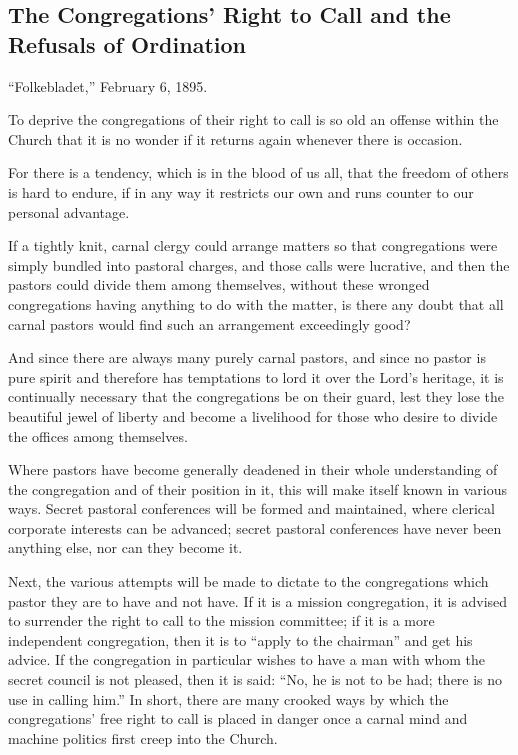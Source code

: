 
\subsection{The Congregations’ Right to Call and the Refusals of Ordination}

“Folkebladet,” February 6, 1895.

To deprive the congregations of their right to call is so old an offense within the Church that it is no wonder if it returns again whenever there is occasion.

For there is a tendency, which is in the blood of us all, that the freedom of others is hard to endure, if in any way it restricts our own and runs counter to our personal advantage.

If a tightly knit, carnal clergy could arrange matters so that congregations were simply bundled into pastoral charges, and those calls were lucrative, and then the pastors could divide them among themselves, without these wronged congregations having anything to do with the matter, is there any doubt that all carnal pastors would find such an arrangement exceedingly good?

And since there are always many purely carnal pastors, and since no pastor is pure spirit and therefore has temptations to lord it over the Lord’s heritage, it is continually necessary that the congregations be on their guard, lest they lose the beautiful jewel of liberty and become a livelihood for those who desire to divide the offices among themselves.

Where pastors have become generally deadened in their whole understanding of the congregation and of their position in it, this will make itself known in various ways. Secret pastoral conferences will be formed and maintained, where clerical corporate interests can be advanced; secret pastoral conferences have never been anything else, nor can they become it.

Next, the various attempts will be made to dictate to the congregations which pastor they are to have and not have. If it is a mission congregation, it is advised to surrender the right to call to the mission committee; if it is a more independent congregation, then it is to “apply to the chairman” and get his advice. If the congregation in particular wishes to have a man with whom the secret council is not pleased, then it is said: “No, he is not to be had; there is no use in calling him.” In short, there are many crooked ways by which the congregations’ free right to call is placed in danger once a carnal mind and machine politics first creep into the Church.

